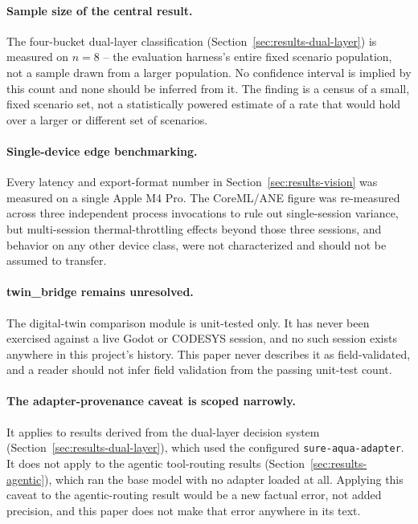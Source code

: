 \paragraph{Sample size of the central result.} The four-bucket dual-layer classification
(Section~\ref{sec:results-dual-layer}) is measured on $n=8$ -- the evaluation harness's entire
fixed scenario population, not a sample drawn from a larger population. No confidence interval is
implied by this count and none should be inferred from it. The finding is a census of a small,
fixed scenario set, not a statistically powered estimate of a rate that would hold over a larger or
different set of scenarios.

\paragraph{Single-device edge benchmarking.} Every latency and export-format number in
Section~\ref{sec:results-vision} was measured on a single Apple M4 Pro. The CoreML/ANE figure was
re-measured across three independent process invocations to rule out single-session variance, but
multi-session thermal-throttling effects beyond those three sessions, and behavior on any other
device class, were not characterized and should not be assumed to transfer.

\paragraph{twin\_bridge remains unresolved.} The digital-twin comparison module is unit-tested
only. It has never been exercised against a live Godot or CODESYS session, and no such session
exists anywhere in this project's history. This paper never describes it as field-validated, and a
reader should not infer field validation from the passing unit-test count.

\paragraph{The adapter-provenance caveat is scoped narrowly.} It applies to results derived from
the dual-layer decision system (Section~\ref{sec:results-dual-layer}), which used the configured
\texttt{sure-aqua-adapter}. It does not apply to the agentic tool-routing results
(Section~\ref{sec:results-agentic}), which ran the base model with no adapter loaded at all.
Applying this caveat to the agentic-routing result would be a new factual error, not added
precision, and this paper does not make that error anywhere in its text.

